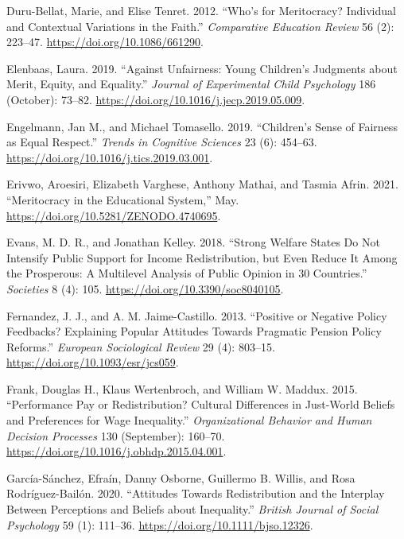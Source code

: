 \documentclass[
  letterpaper,
  DIV=11,
  numbers=noendperiod]{scrartcl}
\newlength{\cslhangindent}
\newenvironment{CSLReferences}[2] %
 {\begin{list}{}{%
  \setlength{\itemindent}{0pt}
  \setlength{\leftmargin}{0pt}
  \setlength{\parsep}{0pt}
  \ifodd #1
   \setlength{\leftmargin}{\cslhangindent}
   \setlength{\itemindent}{-1\cslhangindent}
  \fi
  \setlength{\itemsep}{#2\baselineskip}}}
 {\end{list}}
\begin{document}
\begin{CSLReferences}{1}{0}
Duru-Bellat, Marie, and Elise Tenret. 2012. {``Who's for {Meritocracy}?
{Individual} and {Contextual Variations} in the {Faith}.''}
\emph{Comparative Education Review} 56 (2): 223--47.
\url{https://doi.org/10.1086/661290}.

Elenbaas, Laura. 2019. {``Against Unfairness: {Young} Children's
Judgments about Merit, Equity, and Equality.''} \emph{Journal of
Experimental Child Psychology} 186 (October): 73--82.
\url{https://doi.org/10.1016/j.jecp.2019.05.009}.

Engelmann, Jan M., and Michael Tomasello. 2019. {``Children's {Sense} of
{Fairness} as {Equal Respect}.''} \emph{Trends in Cognitive Sciences} 23
(6): 454--63. \url{https://doi.org/10.1016/j.tics.2019.03.001}.

Erivwo, Aroesiri, Elizabeth Varghese, Anthony Mathai, and Tasmia Afrin.
2021. {``Meritocracy in the {Educational System},''} May.
\url{https://doi.org/10.5281/ZENODO.4740695}.

Evans, M. D. R., and Jonathan Kelley. 2018. {``Strong {Welfare States Do
Not Intensify Public Support} for {Income Redistribution}, but {Even
Reduce It} Among the {Prosperous}: {A Multilevel Analysis} of {Public
Opinion} in 30 {Countries}.''} \emph{Societies} 8 (4): 105.
\url{https://doi.org/10.3390/soc8040105}.

Fernandez, J. J., and A. M. Jaime-Castillo. 2013. {``Positive or
{Negative Policy Feedbacks}? {Explaining Popular Attitudes Towards
Pragmatic Pension Policy Reforms}.''} \emph{European Sociological
Review} 29 (4): 803--15. \url{https://doi.org/10.1093/esr/jcs059}.

Frank, Douglas H., Klaus Wertenbroch, and William W. Maddux. 2015.
{``Performance Pay or Redistribution? {Cultural} Differences in
Just-World Beliefs and Preferences for Wage Inequality.''}
\emph{Organizational Behavior and Human Decision Processes} 130
(September): 160--70. \url{https://doi.org/10.1016/j.obhdp.2015.04.001}.

García-Sánchez, Efraín, Danny Osborne, Guillermo B. Willis, and Rosa
Rodríguez-Bailón. 2020. {``Attitudes Towards Redistribution and the
Interplay Between Perceptions and Beliefs about Inequality.''}
\emph{British Journal of Social Psychology} 59 (1): 111--36.
\url{https://doi.org/10.1111/bjso.12326}.


\end{CSLReferences}
\end{document}
